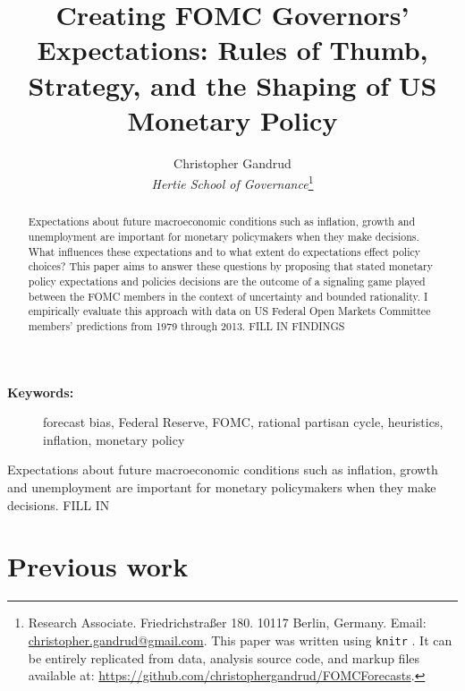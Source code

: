 \documentclass[a4paper]{article}\usepackage{graphicx, color}
\title{Creating FOMC Governors' Expectations: Rules of Thumb, Strategy, and the Shaping of US Monetary Policy}
\author{Christopher Gandrud \\
                {\emph{Hertie School of Governance}}\footnote{Research Associate. Friedrichstra{\ss}er 180. 10117 Berlin, Germany. Email: \href{mailto:christopher.gandrud@gmail.com}{christopher.gandrud@gmail.com}. This paper was written using {\tt{knitr}} \citep{R-knitr}. It can be entirely replicated from data, analysis source code, and markup files available at: {\url{https://github.com/christophergandrud/FOMCForecasts}}.}}
\begin{document}
\maketitle

\begin{abstract}
    Expectations about future macroeconomic conditions such as inflation, growth and unemployment are important for monetary policymakers when they make decisions. What influences these expectations and to what extent do expectations effect policy choices? This paper aims to answer these questions by proposing that stated monetary policy expectations and policies decisions are the outcome of a signaling game played between the FOMC members in the context of uncertainty and bounded rationality. I empirically evaluate this approach with data on US Federal Open Markets Committee members' predictions from 1979 through 2013. FILL IN FINDINGS
\end{abstract}

\begin{description}
  \item [{\textbf{Keywords:}}] forecast bias, Federal Reserve, FOMC, rational partisan cycle, heuristics, inflation, monetary policy
\end{description}


Expectations about future macroeconomic conditions such as inflation, growth and unemployment are important for monetary policymakers when they make decisions. FILL IN

\section{Previous work}
\end{document}
